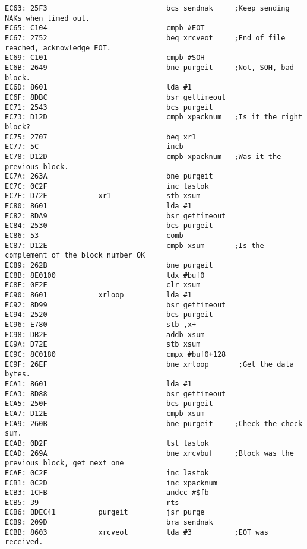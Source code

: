 {\begin{verbatim}
EC63: 25F3                            bcs sendnak     ;Keep sending NAKs when timed out.
EC65: C104                            cmpb #EOT               
EC67: 2752                            beq xrcveot     ;End of file reached, acknowledge EOT.
EC69: C101                            cmpb #SOH
EC6B: 2649                            bne purgeit     ;Not, SOH, bad block.
EC6D: 8601                            lda #1
EC6F: 8DBC                            bsr gettimeout  
EC71: 2543                            bcs purgeit                             
EC73: D12D                            cmpb xpacknum   ;Is it the right block?
EC75: 2707                            beq xr1
EC77: 5C                              incb
EC78: D12D                            cmpb xpacknum   ;Was it the previous block.
EC7A: 263A                            bne purgeit     
EC7C: 0C2F                            inc lastok
EC7E: D72E            xr1             stb xsum
EC80: 8601                            lda #1
EC82: 8DA9                            bsr gettimeout
EC84: 2530                            bcs purgeit
EC86: 53                              comb
EC87: D12E                            cmpb xsum       ;Is the complement of the block number OK
EC89: 262B                            bne purgeit             
EC8B: 8E0100                          ldx #buf0
EC8E: 0F2E                            clr xsum
EC90: 8601            xrloop          lda #1
EC92: 8D99                            bsr gettimeout  
EC94: 2520                            bcs purgeit
EC96: E780                            stb ,x+
EC98: DB2E                            addb xsum
EC9A: D72E                            stb xsum
EC9C: 8C0180                          cmpx #buf0+128
EC9F: 26EF                            bne xrloop       ;Get the data bytes.           
ECA1: 8601                            lda #1
ECA3: 8D88                            bsr gettimeout
ECA5: 250F                            bcs purgeit
ECA7: D12E                            cmpb xsum
ECA9: 260B                            bne purgeit     ;Check the check sum.
ECAB: 0D2F                            tst lastok
ECAD: 269A                            bne xrcvbuf     ;Block was the previous block, get next one
ECAF: 0C2F                            inc lastok
ECB1: 0C2D                            inc xpacknum
ECB3: 1CFB                            andcc #$fb
ECB5: 39                              rts
ECB6: BDEC41          purgeit         jsr purge
ECB9: 209D                            bra sendnak             
ECBB: 8603            xrcveot         lda #3          ;EOT was received.

\end{verbatim}}
